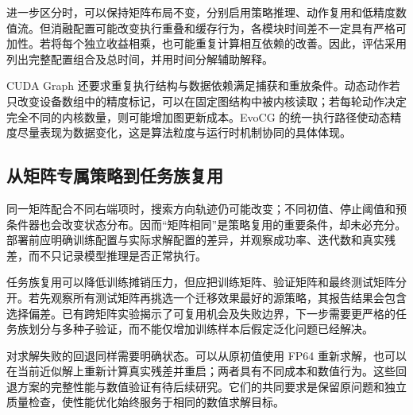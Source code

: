 进一步区分时，可以保持矩阵布局不变，分别启用策略推理、动作复用和低精度数值流。但消融配置可能改变执行重叠和缓存行为，各模块时间差不一定具有严格可加性。若将每个独立收益相乘，也可能重复计算相互依赖的改善。因此，评估采用列出完整配置组合及总时间，并用时间分解辅助解释。

CUDA Graph 还要求重复执行结构与数据依赖满足捕获和重放条件。动态动作若只改变设备数组中的精度标记，可以在固定图结构中被内核读取；若每轮动作决定完全不同的内核数量，则可能增加图更新成本。EvoCG 的统一执行路径使动态精度尽量表现为数据变化，这是算法粒度与运行时机制协同的具体体现。

\subsection{从矩阵专属策略到任务族复用}
同一矩阵配合不同右端项时，搜索方向轨迹仍可能改变；不同初值、停止阈值和预条件器也会改变状态分布。因而“矩阵相同”是策略复用的重要条件，却未必充分。部署前应明确训练配置与实际求解配置的差异，并观察成功率、迭代数和真实残差，而不只记录模型推理是否正常执行。

任务族复用可以降低训练摊销压力，但应把训练矩阵、验证矩阵和最终测试矩阵分开。若先观察所有测试矩阵再挑选一个迁移效果最好的源策略，其报告结果会包含选择偏差。已有跨矩阵实验揭示了可复用机会及失败边界，下一步需要更严格的任务族划分与多种子验证，而不能仅增加训练样本后假定泛化问题已经解决。

对求解失败的回退同样需要明确状态。可以从原初值使用 FP64 重新求解，也可以在当前近似解上重新计算真实残差并重启；两者具有不同成本和数值行为。这些回退方案的完整性能与数值验证有待后续研究。它们的共同要求是保留原问题和独立质量检查，使性能优化始终服务于相同的数值求解目标。
